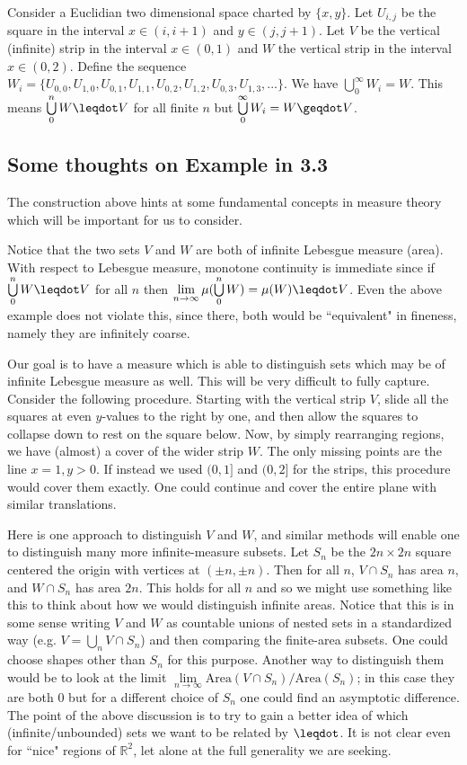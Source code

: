 \documentclass[10pt, onecolumn, longbibliography, nofootinbib]{revtex4-2}
\begin{document}
Consider a Euclidian two dimensional space charted by $\{x,y\}$. Let $U_{i,j}$ be the square in the interval $x \in (i, i+1)$ and $y \in (j, j+1)$. Let $V$ be the vertical (infinite) strip in the interval $x \in (0, 1)$ and $W$ the vertical strip in the interval $x \in (0, 2)$. Define the sequence $W_i = \{ U_{0,0}, U_{1,0}, U_{0,1}, U_{1,1}, U_{0,2}, U_{1,2}, U_{0,3}, U_{1,3}, ... \}$. We have $\bigcup\limits_0^\infty W_i = W$. This means $\bigcup\limits_0^n W\finer V$ for all finite $n$ but $\bigcup\limits_0^\infty W_i = W \coarser V$. 

\subsection{Some thoughts on Example in 3.3}

The construction above hints at some fundamental concepts in measure theory which will be important for us to consider. 

Notice that the two sets $V$ and $W$ are both of infinite Lebesgue measure (area). With respect to Lebesgue measure, monotone continuity is immediate since if $\bigcup\limits_0^n W\finer V$ for all $n$ then $\lim\limits_{n\to\infty}\mu(\bigcup\limits_0^n W) = \mu(W)\finer V$. Even the above example does not violate this, since there, both would be ``equivalent" in fineness, namely they are infinitely coarse.

Our goal is to have a measure which is able to distinguish sets which may be of infinite Lebesgue measure as well. This will be very difficult to fully capture. Consider the following procedure. Starting with the vertical strip $V$, slide all the squares at even $y$-values to the right by one, and then allow the squares to collapse down to rest on the square below. Now, by simply rearranging regions, we have (almost) a cover of the wider strip $W$. The only missing points are the line $x=1, y>0$. If instead we used $(0,1]$ and $(0,2]$ for the strips, this procedure would cover them exactly. One could continue and cover the entire plane with similar translations. 

Here is one approach to distinguish $V$ and $W$, and similar methods will enable one to distinguish many more infinite-measure subsets. Let $S_n$ be the $2n\times 2n$ square centered the origin with vertices at $(\pm n, \pm n)$. Then for all $n$, $V\cap S_n$ has area $n$, and $W\cap S_n$ has area $2n$. This holds for all $n$ and so we might use something like this to think about how we would distinguish infinite areas. Notice that this is in some sense writing $V$ and $W$ as countable unions of nested sets in a standardized way (e.g. $V = \bigcup\limits_n V\cap S_n$) and then comparing the finite-area subsets. One could choose shapes other than $S_n$ for this purpose. Another way to distinguish them would be to look at the limit $\lim\limits_{n\to\infty}\text{Area}(V\cap S_n)/\text{Area}(S_n)$; in this case they are both 0 but for a different choice of $S_n$ one could find an asymptotic difference. 
The point of the above discussion is to try to gain a better idea of which (infinite/unbounded) sets we want to be related by $\finer$. It is not clear even for ``nice" regions of $\mathbb{R}^2$, let alone at the full generality we are seeking. 
\end{document}
